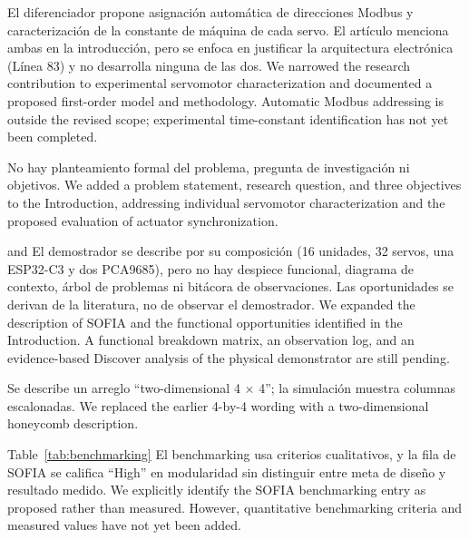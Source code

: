 \documentclass{LabDSTresponse}
\begin{document}
	
	{El diferenciador propone asignación automática de direcciones Modbus y caracterización de la constante de máquina de cada servo. El artículo menciona ambas en la introducción, pero se enfoca en justificar la arquitectura electrónica (Línea 83) y no desarrolla ninguna de las dos.}
	{We narrowed the research contribution
		to experimental servomotor
		characterization and documented a
		proposed first-order model and
		methodology. Automatic Modbus
		addressing is outside the revised
		scope; experimental time-constant identification has not yet been completed.}
	
	{No hay planteamiento formal del problema, pregunta de investigación ni objetivos.}
	{We added a problem statement, research question, and three objectives to the Introduction, addressing individual servomotor characterization and the proposed evaluation of actuator synchronization.}
	
	{ and }
	{El demostrador se describe por su composición (16 unidades, 32 servos, una ESP32-C3 y dos PCA9685), pero no hay despiece funcional, diagrama de contexto, árbol de problemas ni bitácora de observaciones. Las oportunidades se derivan de la literatura, no de observar el demostrador.}
	{We expanded the description of SOFIA and the functional opportunities identified in the Introduction. A functional breakdown matrix, an observation log, and an evidence-based Discover analysis of the physical demonstrator are still pending.}
	
	{Se describe un arreglo “two-dimensional 4 $\times$ 4”; la simulación muestra columnas escalonadas.}
	{We replaced the earlier 4-by-4 wording with a two-dimensional honeycomb description.}
	
	{Table~\ref{tab:benchmarking}}
	{El benchmarking usa criterios cualitativos, y la fila de SOFIA se califica “High” en modularidad sin distinguir entre meta de diseño y resultado medido.}
	{We explicitly identify the SOFIA benchmarking entry as proposed rather than measured. However, quantitative benchmarking criteria and measured values have not yet been added.}
	
\end{document}
